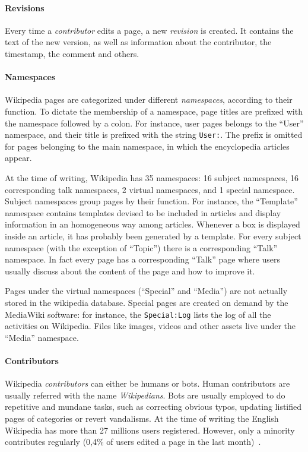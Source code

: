 \paragraph{Revisions}
Every time a \emph{contributor} edits a page, a new \emph{revision} is created.
It contains the text of the new version, as well as information about the contributor, the timestamp, the comment and others.

\paragraph{Namespaces}
Wikipedia pages are categorized under different \emph{namespaces}, according to their function.
To dictate the membership of a namespace, page titles are prefixed with the namespace followed by a colon.
For instance, user pages belongs to the ``User'' namespace, and their title is prefixed with the string \texttt{User:}.
The prefix is omitted for pages belonging to the main namespace, in which the encyclopedia articles appear.

At the time of writing, Wikipedia has 35 namespaces: 16 subject namespaces, 16 corresponding talk namespaces, 2 virtual namespaces, and 1 special namespace.
Subject namespaces group pages by their function.
For instance, the ``Template'' namespace contains templates devised to be included in articles and display information in an homogeneous way among articles.
Whenever a box is displayed inside an article, it has probably been generated by a template.
For every subject namespace (with the exception of ``Topic'') there is a corresponding ``Talk'' namespace.
In fact every page has a corresponding ``Talk'' page where users usually discuss about the content of the page and how to improve it.


Pages under the virtual namespaces (``Special'' and ``Media'') are not actually stored in the wikipedia database.
Special pages are created on demand by the MediaWiki software: for instance, the \texttt{Special:Log} lists the log of all the activities on Wikipedia.
Files like images, videos and other assets live under the ``Media'' namespace.

\paragraph{Contributors}
Wikipedia \emph{contributors} can either be humans or bots.
Human contributors are usually referred with the name \emph{Wikipedians}.
Bots are usually employed to do repetitive and mundane tasks, such as correcting obvious typos, updating listified pages of categories or revert vandalisms.
At the time of writing the English Wikipedia has more than 27 millions users registered.
However, only a minority contributes regularly (0,4\% of users edited a page in the last month)~\cite{wiki:wikipedians}.

